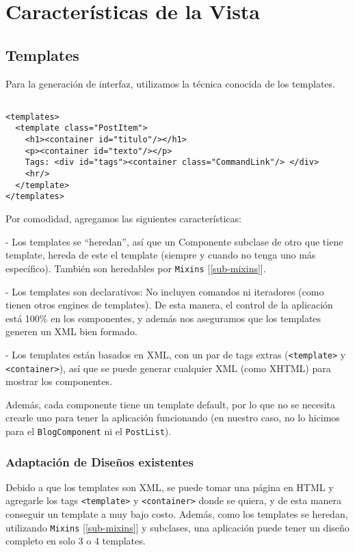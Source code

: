 \section{Características de la Vista}
\label{sec-view}
\subsection{Templates}
\label{sub-templates}
Para la generación de interfaz, utilizamos la técnica conocida de los templates.

\begin{verbatim}

<templates>
  <template class="PostItem">
    <h1><container id="titulo"/></h1>
    <p><container id="texto"/></p>
    Tags: <div id="tags"><container class="CommandLink"/> </div>
    <hr/>
  </template>
</templates>

\end{verbatim}

Por comodidad, agregamos las siguientes características:

- Los templates se ``heredan'', así que un Componente subclase de otro que tiene template, hereda de este el template (siempre y cuando no tenga uno más específico). También son heredables por \verb"Mixins" [\ref{sub-mixins}].

- Los templates son declarativos: No incluyen comandos ni iteradores (como tienen otros engines de templates). De esta manera, el control de la aplicación está 100\% en los componentes, y además nos aseguramos que los templates generen un XML bien formado.

- Los templates están basados en XML, con un par de tags extras (\verb"<template>" y \verb"<container>"), así que se puede generar cualquier XML (como XHTML) para mostrar los componentes.

Además, cada componente tiene un template default, por lo que no se necesita crearle uno para tener la aplicación funcionando (en nuestro caso, no lo hicimos para el \verb"BlogComponent" ni el \verb"PostList").

\subsubsection{Adaptación de Diseños existentes}
\label{sub-templates-adapt}
Debido a que los templates son XML, se puede tomar una página en HTML y agregarle los tags \verb"<template>" y \verb"<container>" donde se quiera, y de esta manera conseguir un template a muy bajo costo. Además, como los templates se heredan, utilizando \verb"Mixins" [\ref{sub-mixins}] y subclases, una aplicación puede tener un diseño completo en solo 3 o 4 templates.

